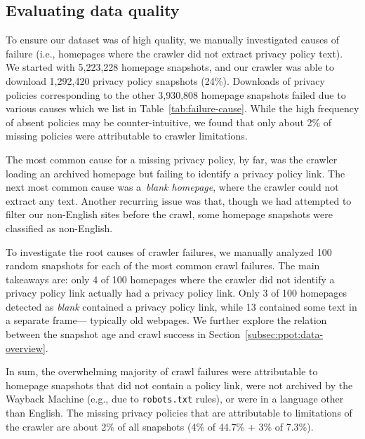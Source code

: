 \subsection{Evaluating data quality}
\label{subsec:ppot:failure-analysis}

To ensure our dataset was of high quality, we manually investigated causes of failure (i.e., homepages where the crawler did not extract privacy policy text). We started with 5,223,228 homepage snapshots, and our crawler was able to download 1,292,420 privacy policy snapshots (24\%).
Downloads of privacy policies corresponding to the other 3,930,808 homepage snapshots failed due to various causes which we list in Table~\ref{tab:failure-cause}. While the high frequency of absent policies may be counter-intuitive, we found that only about 2\% of missing policies were attributable to crawler limitations.

The most common cause for a missing privacy policy, by far, was the crawler loading an archived homepage but failing to identify a privacy policy link.
The next most common cause was a~\emph{blank homepage}, where the crawler could not extract any text. Another recurring issue was that, though we had attempted to filter our non-English sites before the crawl, some homepage snapshots were classified as non-English.

To investigate the root causes of crawler failures, we manually analyzed 100 random snapshots for each of the most common crawl failures.
The main takeaways are:
only 4 of 100 homepages where the crawler did not identify a privacy policy link actually had a privacy policy link. Only 3 of 100 homepages detected as \emph{blank} contained a privacy policy link, while 13 contained some text in a separate frame--- typically old webpages. We further explore the relation between the snapshot age and crawl success in 
Section~\ref{subsec:ppot:data-overview}.

In sum, the overwhelming majority of crawl failures were attributable to homepage snapshots that did not contain a policy link, were not archived by the Wayback Machine (e.g., due to \texttt{robots.txt} rules), or were in a language other than English. The missing privacy policies that are attributable to limitations of the crawler are about 2\% of all snapshots (4\% of 44.7\% + 3\% of 7.3\%).


